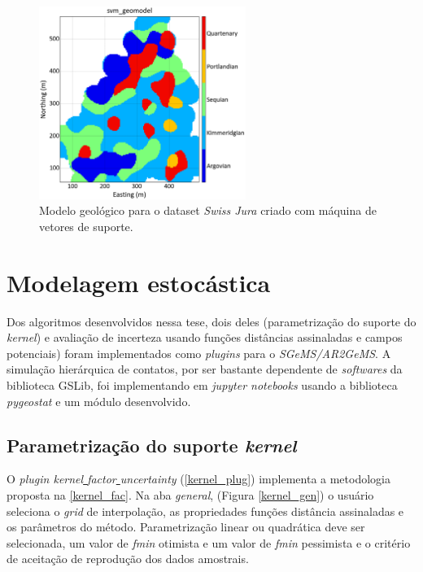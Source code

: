 \begin{figure}[H]
	\centering
	\caption{\label{jura_svm}Modelo geológico para o dataset \textit{Swiss Jura} criado com máquina de vetores de suporte.}
	\includegraphics[width=0.6\textwidth]{apendice_a/imagens/svmgeomodel.png}
\end{figure}

\section{Modelagem estocástica}

Dos algoritmos desenvolvidos nessa tese, dois deles (parametrização do suporte do \textit{kernel}) e avaliação de incerteza usando funções distâncias assinaladas e campos potenciais) foram implementados como \textit{plugins} para o \textit{SGeMS/AR2GeMS}. A simulação hierárquica de contatos, por ser bastante dependente de \textit{softwares} da biblioteca GSLib, foi implementando em \textit{jupyter notebooks} usando a biblioteca \textit{pygeostat} e um módulo desenvolvido.

\subsection{Parametrização do suporte \textit{kernel}}

O \textit{plugin kernel\underline{ }factor\underline{ }uncertainty} (\autoref{kernel_plug}) implementa a metodologia proposta na \autoref{kernel_fac}. Na aba \textit{general}, (Figura \autoref{kernel_gen}) o usuário seleciona o \textit{grid} de interpolação, as propriedades funções distância assinaladas e os parâmetros do método. Parametrização linear ou  quadrática deve ser selecionada, um valor de \textit{fmin} otimista e um valor de \textit{fmin} pessimista e o critério de aceitação de reprodução dos dados amostrais.

